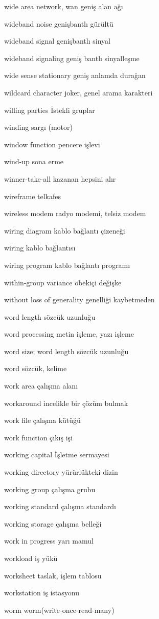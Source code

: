 \documentclass[12pt,fleqn]{article}\usepackage{../../common}
\begin{document}
wide area network, wan geniş alan ağı

wideband noise genişbantlı gürültü

wideband signal genişbantlı sinyal

wideband signaling geniş bantlı sinyalleşme

wide sense stationary geniş anlamda durağan

wildcard character joker, genel arama karakteri

willing parties İstekli gruplar

winding sargı (motor)

window function pencere işlevi

wind-up sona erme

winner-take-all kazanan hepsini alır

wireframe telkafes

wireless modem radyo modemi, telsiz modem

wiring diagram kablo bağlantı çizeneği

wiring kablo bağlantısı

wiring program kablo bağlantı programı

within-group variance öbekiçi değişke

without loss of generality genelliği kaybetmeden

word length sözcük uzunluğu

word processing metin işleme, yazı işleme

word size; word length sözcük uzunluğu

word sözcük, kelime

work area çalışma alanı

workaround incelikle bir çözüm bulmak

work file çalışma kütüğü

work function çıkış işi

working capital İşletme sermayesi

working directory yürürlükteki dizin

working group çalışma grubu

working standard çalışma standardı

working storage çalışma belleği

work in progress yarı mamul

workload iş yükü

worksheet taslak, işlem tablosu

workstation iş istasyonu

worm worm(write-once-read-many)
\end{document}
